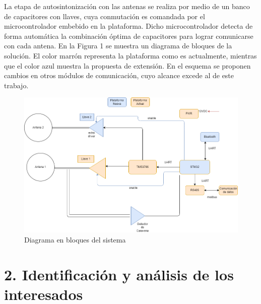 \documentclass[
11pt, %
]{charter}
\begin{document}
La etapa de autosintonización con las antenas se realiza por medio de un banco de capacitores con llaves, cuya conmutación es comandada por el microcontrolador embebido en la plataforma. Dicho microcontrolador detecta de forma automática la combinación óptima de capacitores para lograr comunicarse con cada antena. En la Figura 1 se muestra un diagrama de bloques de la solución. El color marrón representa la plataforma como es actualmente, mientras que el color azul muestra la propuesta de extensión. En el esquema se proponen cambios en otros módulos de comunicación, cuyo alcance excede al de este trabajo.   





\begin{figure}[htpb]
\centering 
\includegraphics[width=1\textwidth]{./Figuras/Diagrama-de-bloques.png}
\caption{Diagrama en bloques del sistema}
\label{fig:diagBloques}
\end{figure}

\vspace{25px}


\section{2. Identificación y análisis de los interesados}
\label{sec:interesados}
\end{document}
